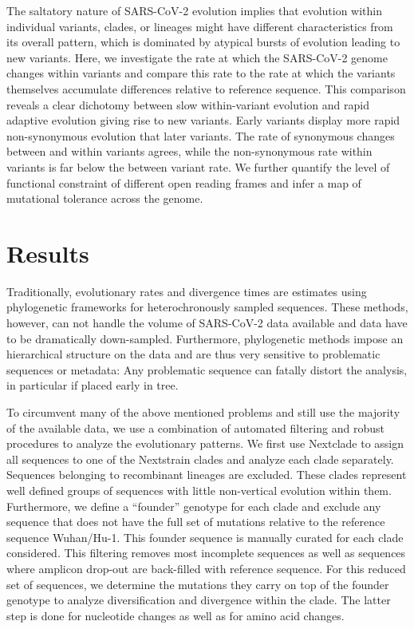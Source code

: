 \documentclass[aps,rmp, twocolumn]{revtex4}
\begin{document}
The saltatory nature of SARS-CoV-2 evolution implies that evolution within individual variants, clades, or lineages might have different characteristics from its overall pattern, which is dominated by atypical bursts of evolution leading to new variants.
Here, we investigate the rate at which the SARS-CoV-2 genome changes within variants and compare this rate to the rate at which the variants themselves accumulate differences relative to reference sequence.
This comparison reveals a clear dichotomy between slow within-variant evolution and rapid adaptive evolution giving rise to new variants.
Early variants display more rapid non-synonymous evolution that later variants.
The rate of synonymous changes between and within variants agrees, while the non-synonymous rate within variants is far below the between variant rate.
We further quantify the level of functional constraint of different open reading frames and infer a map of mutational tolerance across the genome.

\section*{Results}

Traditionally, evolutionary rates and divergence times are estimates using phylogenetic frameworks for heterochronously sampled sequences.
These methods, however, can not handle the volume of SARS-CoV-2 data available and data have to be dramatically down-sampled.
Furthermore, phylogenetic methods impose an hierarchical structure on the data and are thus very sensitive to problematic sequences or metadata: Any problematic sequence can fatally distort the analysis, in particular if placed early in tree.

To circumvent many of the above mentioned problems and still use the majority of the available data, we use a combination of automated filtering and robust procedures to analyze the evolutionary patterns.
We first use Nextclade \citep{aksamentov_nextclade_2021} to assign all sequences to one of the Nextstrain clades \citep{hadfield_nextstrain_2018} and analyze each clade separately.
Sequences belonging to recombinant lineages are excluded.
These clades represent well defined groups of sequences with little non-vertical evolution within them.
Furthermore, we define a ``founder'' genotype for each clade and exclude any sequence that does not have the full set of mutations relative to the reference sequence Wuhan/Hu-1.
This founder sequence is manually curated for each clade considered.
This filtering removes most incomplete sequences as well as sequences where amplicon drop-out are back-filled with reference sequence.
For this reduced set of sequences, we determine the mutations they carry on top of the founder genotype to analyze diversification and divergence within the clade.
The latter step is done for nucleotide changes as well as for amino acid changes.
\end{document}

